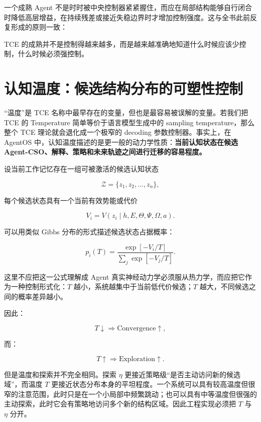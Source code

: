 一个成熟 Agent 不是时时被中央控制器紧紧握住，而应在局部结构能够自行闭合时降低高层增益，在持续残差或接近失稳边界时才增加控制强度。这与全书此前反复形成的原则一致：

\begin{statementbox}
\centering
{}
\end{statementbox}

TCE 的成熟并不是控制得越来越多，而是越来越准确地知道什么时候应该少控制，什么时候必须强控制。

\section{认知温度：候选结构分布的可塑性控制}

“温度”是 TCE 名称中最早存在的变量，但也是最容易被误解的变量。若我们把 TCE 的 Temperature 简单等价于语言模型生成中的 sampling temperature，那么整个 TCE 理论就会退化成一个极窄的 decoding 参数控制器。事实上，在 AgentOS 中，认知温度描述的是更一般的动力学性质：\textbf{当前认知状态在候选 Agent-CSO、解释、策略和未来轨迹之间进行迁移的容易程度。}

设当前工作记忆存在一组可被激活的候选认知状态

\[
\mathcal Z
=
\{z_1,z_2,\ldots,z_n\},
\]

每个候选状态具有一个当前有效势能或代价

\[
V_i
=
V(z_i\mid h,E,\Theta,\Psi,\Omega,a).
\]

可以用类似 Gibbs 分布的形式描述候选状态占据概率：

\[
p_i(T)
=
\frac{
\exp\left[-V_i/T\right]
}{
\sum_j
\exp\left[-V_j/T\right]
}.
\]

这里不应把这一公式理解成 Agent 真实神经动力学必须服从热力学，而应把它作为一种控制形式化：$T$ 越小，系统越集中于当前低代价候选；$T$ 越大，不同候选之间的概率差异越小。

因此：

\[
T\downarrow
\Rightarrow
\text{Convergence}\uparrow,
\]

而：

\[
T\uparrow
\Rightarrow
\text{Exploration}\uparrow.
\]

但是温度和探索并不完全相同。探索 $\eta$ 更接近策略级“是否主动访问新的候选域”，而温度 $T$ 更接近状态分布本身的平坦程度。一个系统可以具有较高温度但很窄的注意范围，此时只是在一个小局部中频繁跳动；也可以具有中等温度但很强的主动探索，此时它会有策略地访问多个新的结构区域。因此工程实现必须把 $T$ 与 $\eta$ 分开。

